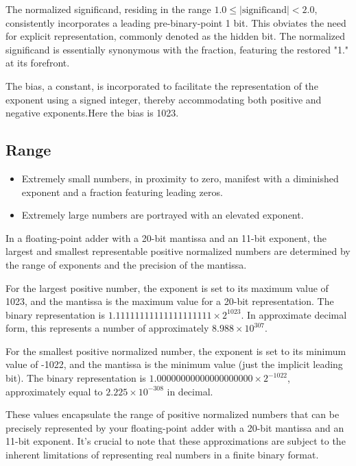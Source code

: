 \documentclass[12pt]{article}
\begin{document}
The normalized significand, residing in the range \(1.0 \leq \lvert \text{significand} \rvert < 2.0\), consistently incorporates a leading pre-binary-point 1 bit. This obviates the need for explicit representation, commonly denoted as the hidden bit. The normalized significand is essentially synonymous with the fraction, featuring the restored "1." at its forefront.

The bias, a constant, is incorporated to facilitate the representation of the exponent using a signed integer, thereby accommodating both positive and negative exponents.Here the bias is 1023.

\newpage

\subsection{Range }

\begin{itemize}
	\item Extremely small numbers, in proximity to zero, manifest with a diminished exponent and a fraction featuring leading zeros.
	\item Extremely large numbers are portrayed with an elevated exponent.
\end{itemize}

In a floating-point adder with a 20-bit mantissa and an 11-bit exponent, the largest and smallest representable positive normalized numbers are determined by the range of exponents and the precision of the mantissa.

For the largest positive number, the exponent is set to its maximum value of 1023, and the mantissa is the maximum value for a 20-bit representation. The binary representation is \(1.11111111111111111111 \times 2^{1023}\). In approximate decimal form, this represents a number of approximately \(8.988 \times 10^{307}\).

For the smallest positive normalized number, the exponent is set to its minimum value of -1022, and the mantissa is the minimum value (just the implicit leading bit). The binary representation is \(1.00000000000000000000 \times 2^{-1022}\), approximately equal to \(2.225 \times 10^{-308}\) in decimal.

These values encapsulate the range of positive normalized numbers that can be precisely represented by your floating-point adder with a 20-bit mantissa and an 11-bit exponent. It's crucial to note that these approximations are subject to the inherent limitations of representing real numbers in a finite binary format.
\end{document}
